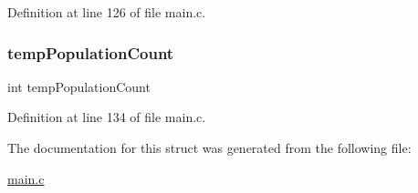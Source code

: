 Definition at line 126 of file main.\+c.

\hypertarget{structparams_a9af1335fe713a9463db9a4cfa7040504}{}\label{structparams_a9af1335fe713a9463db9a4cfa7040504} 
\subsubsection{\texorpdfstring{temp\+Population\+Count}{tempPopulationCount}}
{\footnotesize\ttfamily int temp\+Population\+Count}



Definition at line 134 of file main.\+c.



The documentation for this struct was generated from the following file\+:\begin{DoxyCompactItemize}
\item 
\hyperlink{main_8c}{main.\+c}\end{DoxyCompactItemize}
